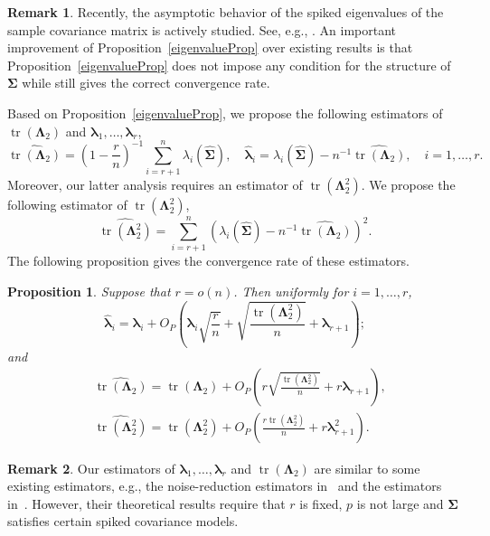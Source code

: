 \documentclass[12pt]{article} %
\DeclareMathOperator{\mytr}{tr}
\newcommand{\bZ}{\mathbf{Z}}
\newcommand{\bfsym}[1]{\ensuremath{\boldsymbol{#1}}}
\def\blambda {\bfsym {\lambda}}
\def\bLambda {\bfsym {\Lambda}}
\def\bSigma {\bfsym {\Sigma}}
\newtheorem{proposition}{Proposition}
\theoremstyle{definition}
\newtheorem{remark}{Remark}
\begin{document}
\begin{remark}
    Recently, the asymptotic behavior of the spiked eigenvalues of the sample covariance matrix is actively studied.
    See, e.g., \cite{Yata2013PCA,Shen2016A,wang2017As,Cai2017Limiting}.
    An important improvement of Proposition~\ref{eigenvalueProp} over existing results is that Proposition~\ref{eigenvalueProp} does not impose any condition for the structure of $\bSigma$ while still gives the correct convergence rate.
\end{remark}

Based on Proposition~\ref{eigenvalueProp}, we propose the following estimators of  $\mytr(\bLambda_2)$ and $\blambda_1,\ldots,\blambda_r$,
\begin{equation*}
    \widehat{\mytr(\bLambda_2)}=\left(1-\frac{r}{n}\right)^{-1}\sum_{i=r+1}^n \lambda_i (\hat{\bSigma})
    ,\quad
    \hat{\blambda}_i=\lambda_i(\hat{\bSigma})-n^{-1}\widehat{\mytr(\bLambda_2)},\quad i=1,\ldots,r.
\end{equation*}
Moreover, our latter analysis requires an estimator of $\mytr(\bLambda_2^2)$.
We propose the following estimator of $\mytr(\bLambda_2^2)$,
\begin{equation*}
    \widehat{\mytr(\bLambda_2^2)}=\sum_{i=r+1}^n \left(\lambda_i(\hat{\bSigma})-n^{-1}\widehat{\mytr(\bLambda_2)}\right)^2.
\end{equation*}
The following proposition gives the convergence rate of these estimators.
\begin{proposition}
    \label{eigenvalueProp:R3}
    Suppose that $r=o(n)$.
    Then uniformly for $i=1,\ldots, r$, 
\begin{equation*}
    \hat{\blambda}_i
        =
        \blambda_i
        +O_P\left(\blambda_i \sqrt{\frac{r}{n}}+\sqrt{\frac{\mytr(\bLambda_2^2)}{ n}}+\blambda_{r+1}\right);
\end{equation*}
and
\begin{align*}
    &\widehat{\mytr(\bLambda_2)}=\mytr(\bLambda_2) + O_P\left(r\sqrt{\frac{\mytr(\bLambda_2^2)}{n}}+r\blambda_{r+1}\right),
        \\
&\widehat{\mytr(\bLambda_2^2)}
        =
         \mytr(\bLambda_2^2)
        +
        O_P\left(\frac{r \mytr(\bLambda_2^2)}{n} + r  \blambda_{r+1}^2\right).
\end{align*}
\end{proposition}
\begin{remark}
    Our estimators of $\blambda_1,\ldots, \blambda_r$ and $\mytr(\bLambda_2)$ are similar to some existing estimators, e.g., the noise-reduction estimators in~\cite{YATA2012193} and the estimators in~\cite{wang2017As}.
    However, their theoretical results require that $r$ is fixed, $p$ is not large and $\bSigma$ satisfies certain spiked covariance models.
\end{remark}
\end{document}
